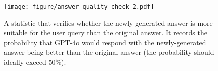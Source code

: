 \begin{figure}[t]
\centering
\texttt{[image: figure/answer\_quality\_check\_2.pdf]}
\caption{
A statistic that verifies whether the newly-generated answer is more suitable for the user query than the original answer.
It records the probability that GPT-4o would respond with the newly-generated answer being better than the original answer (the probability should ideally exceed 50\%).
}
\label{fig:answer_comparison}
\end{figure}